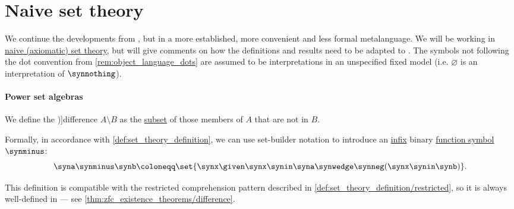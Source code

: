 \section{Naive set theory}\label{sec:naive_set_theory}

We continue the developments from , but in a more established, more convenient and less formal metalanguage. We will be working in \hyperref[def:naive_set_theory]{naive (axiomatic) set theory}, but will give comments on how the definitions and results need to be adapted to \hyperref[def:zfc]{}. The symbols not following the dot convention from \cref{rem:object_language_dots} are assumed to be interpretations in an unspecified fixed model (i.e. \( \varnothing \) is an interpretation of \( \synnothing \)).

\paragraph{Power set algebras}

\begin{definition}\label{def:set_difference}
  We define the \term[ru=разность (\cite[6]{ШеньВерещагин2020НачалаТеорииМножеств})]{difference} \( A \setminus B \) as the \hyperref[def:subset]{subset} of those members of \( A \) that are not in \( B \).

  Formally, in accordance with \cref{def:set_theory_definition}, we can use set-builder notation to introduce an \hyperref[def:fol_signature/notation]{infix} binary \hyperref[def:fol_signature/function]{function symbol} \( {\synminus} \):
  \begin{equation*}
    \syna \synminus \synb \coloneqq \set{ \synx \given \synx \synin \syna \synwedge \synneg (\synx \synin \synb) }.
  \end{equation*}
\end{definition}
\begin{comments}
  \item This definition is compatible with the restricted comprehension pattern described in \cref{def:set_theory_definition/restricted}, so it is always well-defined in \hyperref[def:zfc]{} --- see \cref{thm:zfc_existence_theorems/difference}.
\end{comments}

